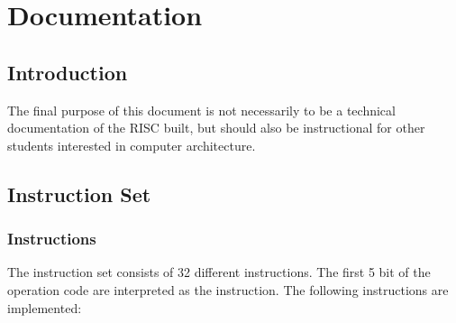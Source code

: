 \documentclass[twoside]{article}
\begin{document}
\section*{Documentation}
\subsection*{Introduction}
The final purpose of this document is not necessarily to be a technical
documentation of the RISC built, but should also be instructional for
other students interested in computer architecture.
\subsection*{Instruction Set}
\subsubsection*{Instructions}
The instruction set consists of 32 different instructions. The first 5 bit of
the operation code are interpreted as the instruction. The following
instructions are implemented:
\end{document}
